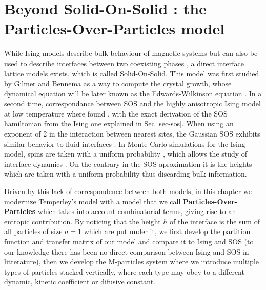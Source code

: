 \chapter{Beyond Solid-On-Solid : the Particles-Over-Particles model}
\label{chap-pop}

While Ising models describe bulk behaviour of magnetic systems \cite{niss_history_2005,niss_history_2009} but can also be used to describe interfaces between two coexisting phases \cite{abraham_interface_1976}, a direct interface lattice models exists, which is called Solid-On-Solid. This model was first studied by Gilmer and Bennema \cite{gilmer_computer_1972,gilmer_simulation_1972} as a way to compute the crystal growth, whose dynamical equation will be later known as the Edwards-Wilkinson equation \cite{edwards_surface_1982,halpin-healy_kinetic_1995} . In a second time, correspondance between SOS and the highly anisotropic Ising model at low temperature where found \cite{swendsen_roughening_1977,guyer_sine-gordon_1979}, with the exact derivation of the SOS hamiltonian from the Ising one explained in Sec \ref{sec-sos}. When using an exponent of 2 in the interaction between nearest sites, the Gaussian SOS exhibits similar behavior to fluid interfaces \cite{h_muller-krumbhaar_kinetic_1976,baillie_solid_1993}.
In Monte Carlo simulations for the Ising model, spins are taken with a uniform probability \cite{metropolis_monte_1949,newman_monte_1999}, which allows the study of interface dynamics \cite{schmittmann_driven_1998,muller_profile_2005,smith_interfaces_2008-1,smith_lateral_2010}. On the contrary in the SOS aproximation it is the heights which are taken with a uniform probability \cite{wilby_scaling_1992,siegert_scaling_1993} thus discarding bulk information. 

Driven by this lack of correspondence between both models, in this chapter we modernize Temperley's model \cite{temperley_statistical_1952} with a model that we call {\bf Particles-Over-Particles} which takes into account combinatorial terms, giving rise to an entropic contribution.
By noticing that the height $h$ of the interface is the sum of all particles of size $a=1$ which are put under it, we first develop the partition function and transfer matrix of our model and compare it to Ising and SOS (to our knowledge there has been no direct comparison between Ising and SOS in litterature), then we develop the M-particles system where we introduce multiple types of particles stacked vertically, where each type may obey to a different dynamic, kinetic coefficient or difusive constant.

